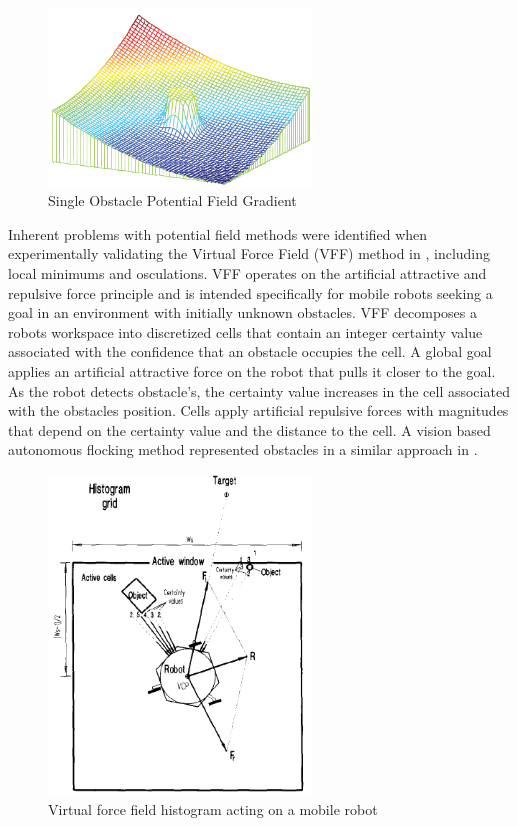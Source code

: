 \documentclass[numbered,pdftex]{ohio-etd}
\begin{document}
\begin{figure}[h!]
	\centering
	\includegraphics[width=7cm]{PaperFigures/pfObstacle}
	\caption{Single Obstacle Potential Field Gradient \cite{liu_virtual-waypoint_2016}}
	\label{fig:pfobstacle}
\end{figure}


Inherent problems with potential field methods were identified when experimentally validating the Virtual Force Field (VFF) method in \cite{koren_potential_1991}, including local minimums and osculations. VFF operates on the artificial  attractive and repulsive force principle and is intended specifically for mobile robots seeking a goal in an environment with initially unknown obstacles. VFF decomposes a robots workspace into discretized cells that contain an integer certainty value associated with the confidence that an obstacle occupies the cell. A global goal applies an artificial attractive force on the robot that pulls it closer to the goal. As the robot detects obstacle's, the certainty value increases in the cell associated with the obstacles position. Cells apply artificial repulsive forces with magnitudes that depend on the certainty value and the distance to the cell. A vision based autonomous flocking method represented obstacles in a similar approach in \cite{liao_vision-based_2016}.


\begin{figure}[H]
	\centering
	\includegraphics[width=7cm]{PaperFigures/histogram}
	\caption{Virtual force field histogram acting on a mobile robot \cite{borenstein_vector_1991}}
	\label{fig:histogram}
\end{figure}
\end{document}
